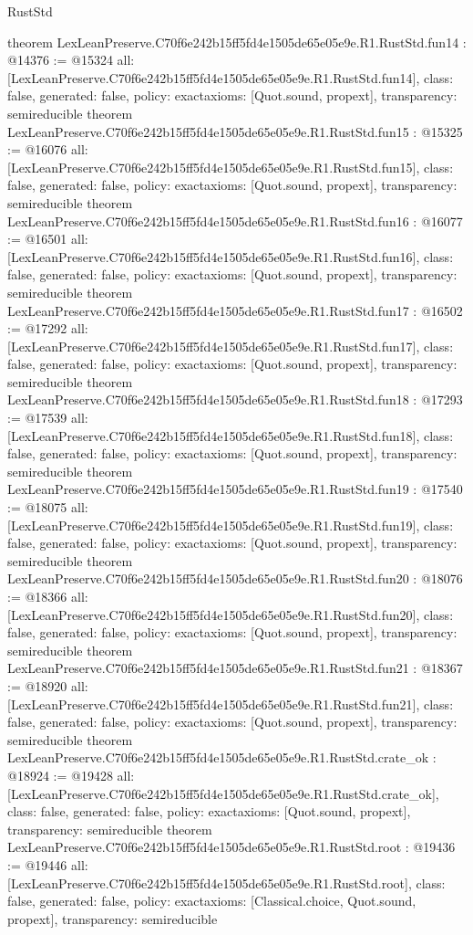 \begin{lexlean}{RustStd}
\begin{coremodule}
{}
theorem LexLeanPreserve.C70f6e242b15ff5fd4e1505de65e05e9e.R1.RustStd.fun14 : @14376 := @15324 {
  all: [LexLeanPreserve.C70f6e242b15ff5fd4e1505de65e05e9e.R1.RustStd.fun14],
  class: false,
  generated: false,
  policy: exact{axioms: [Quot.sound, propext]},
  transparency: semireducible
}
theorem LexLeanPreserve.C70f6e242b15ff5fd4e1505de65e05e9e.R1.RustStd.fun15 : @15325 := @16076 {
  all: [LexLeanPreserve.C70f6e242b15ff5fd4e1505de65e05e9e.R1.RustStd.fun15],
  class: false,
  generated: false,
  policy: exact{axioms: [Quot.sound, propext]},
  transparency: semireducible
}
theorem LexLeanPreserve.C70f6e242b15ff5fd4e1505de65e05e9e.R1.RustStd.fun16 : @16077 := @16501 {
  all: [LexLeanPreserve.C70f6e242b15ff5fd4e1505de65e05e9e.R1.RustStd.fun16],
  class: false,
  generated: false,
  policy: exact{axioms: [Quot.sound, propext]},
  transparency: semireducible
}
theorem LexLeanPreserve.C70f6e242b15ff5fd4e1505de65e05e9e.R1.RustStd.fun17 : @16502 := @17292 {
  all: [LexLeanPreserve.C70f6e242b15ff5fd4e1505de65e05e9e.R1.RustStd.fun17],
  class: false,
  generated: false,
  policy: exact{axioms: [Quot.sound, propext]},
  transparency: semireducible
}
theorem LexLeanPreserve.C70f6e242b15ff5fd4e1505de65e05e9e.R1.RustStd.fun18 : @17293 := @17539 {
  all: [LexLeanPreserve.C70f6e242b15ff5fd4e1505de65e05e9e.R1.RustStd.fun18],
  class: false,
  generated: false,
  policy: exact{axioms: [Quot.sound, propext]},
  transparency: semireducible
}
theorem LexLeanPreserve.C70f6e242b15ff5fd4e1505de65e05e9e.R1.RustStd.fun19 : @17540 := @18075 {
  all: [LexLeanPreserve.C70f6e242b15ff5fd4e1505de65e05e9e.R1.RustStd.fun19],
  class: false,
  generated: false,
  policy: exact{axioms: [Quot.sound, propext]},
  transparency: semireducible
}
theorem LexLeanPreserve.C70f6e242b15ff5fd4e1505de65e05e9e.R1.RustStd.fun20 : @18076 := @18366 {
  all: [LexLeanPreserve.C70f6e242b15ff5fd4e1505de65e05e9e.R1.RustStd.fun20],
  class: false,
  generated: false,
  policy: exact{axioms: [Quot.sound, propext]},
  transparency: semireducible
}
theorem LexLeanPreserve.C70f6e242b15ff5fd4e1505de65e05e9e.R1.RustStd.fun21 : @18367 := @18920 {
  all: [LexLeanPreserve.C70f6e242b15ff5fd4e1505de65e05e9e.R1.RustStd.fun21],
  class: false,
  generated: false,
  policy: exact{axioms: [Quot.sound, propext]},
  transparency: semireducible
}
theorem LexLeanPreserve.C70f6e242b15ff5fd4e1505de65e05e9e.R1.RustStd.crate_ok : @18924 := @19428 {
  all: [LexLeanPreserve.C70f6e242b15ff5fd4e1505de65e05e9e.R1.RustStd.crate_ok],
  class: false,
  generated: false,
  policy: exact{axioms: [Quot.sound, propext]},
  transparency: semireducible
}
theorem LexLeanPreserve.C70f6e242b15ff5fd4e1505de65e05e9e.R1.RustStd.root : @19436 := @19446 {
  all: [LexLeanPreserve.C70f6e242b15ff5fd4e1505de65e05e9e.R1.RustStd.root],
  class: false,
  generated: false,
  policy: exact{axioms: [Classical.choice, Quot.sound, propext]},
  transparency: semireducible
}


\end{coremodule}
\end{lexlean}
